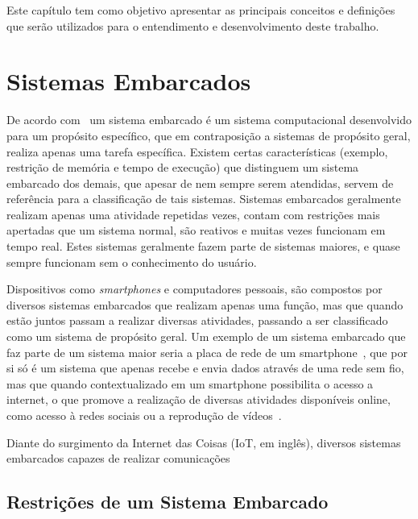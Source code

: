 \label{chapter:conceitos}
Este capítulo tem como objetivo apresentar as principais conceitos e definições que serão utilizados para o entendimento e desenvolvimento deste trabalho. 


\section{Sistemas Embarcados}%

De acordo com~ um sistema embarcado é um sistema computacional desenvolvido para um propósito específico, que em contraposição a sistemas de propósito geral, realiza apenas uma tarefa específica. Existem certas características (exemplo, restrição de memória e tempo de execução) que distinguem um sistema embarcado dos demais, que apesar de nem sempre serem atendidas, servem de referência para a classificação de tais sistemas. Sistemas embarcados geralmente realizam apenas uma atividade repetidas vezes, contam com restrições mais apertadas que um sistema normal, são reativos e muitas vezes funcionam em tempo real. Estes sistemas geralmente fazem parte de sistemas maiores, e quase sempre funcionam sem o conhecimento do usuário.

Dispositivos como \textit{smartphones} e computadores pessoais, são compostos por diversos sistemas embarcados que realizam apenas uma função, mas que quando estão juntos passam a realizar diversas atividades, passando a ser classificado como um sistema de propósito geral. Um exemplo de um sistema embarcado que faz parte de um sistema maior seria a placa de rede de um smartphone~\cite{qualcomm_2017}, que por si só é um sistema que apenas recebe e envia dados através de uma rede sem fio, mas que quando contextualizado em um smartphone possibilita o acesso a internet, o que promove a realização de diversas atividades disponíveis online, como acesso à redes sociais ou a reprodução de vídeos~\cite{VAHID:2001}.

Diante do surgimento da Internet das Coisas (IoT, em inglês), diversos sistemas embarcados capazes de realizar comunicações 



\subsection{Restrições de um Sistema Embarcado} %

